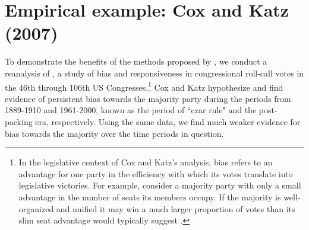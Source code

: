% 


\chapter{Empirical example: Cox and Katz (2007)}
\label{cox_katz}

To demonstrate the benefits of the methods proposed by , we conduct a reanalysis of , a study of bias and responsiveness in congressional roll-call votes in the 46th through 106th US Congresses.\footnote{In the legislative context of Cox and Katz's analysis, bias refers to an advantage for one party in the efficiency with which its votes translate into legislative victories. For example, consider a majority party with only a small advantage in the number of seats its members occupy. If the majority is well-organized and unified it may win a much larger proportion of votes than its slim seat advantage would typically suggest .} Cox and Katz hypothesize and find evidence of persistent bias towards the majority party during the periods from 1889-1910 and 1961-2000, known as the period of ``czar rule" and the post-packing era, respectively. Using the same data, we find much weaker evidence for bias towards the majority over the time periods in question. 


